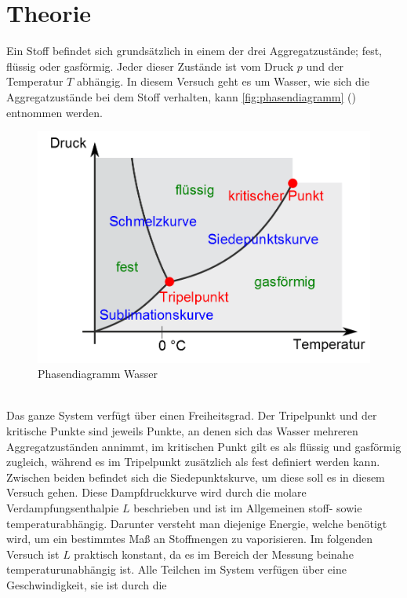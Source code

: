 \section{Theorie}
\label{sec:Theorie}

Ein Stoff befindet sich grundsätzlich in einem der drei Aggregatzustände;
fest, flüssig oder gasförmig. Jeder dieser Zustände ist vom Druck $p$ und
der Temperatur $T$ abhängig. In diesem Versuch geht es um Wasser, wie sich 
die Aggregatzustände bei dem Stoff verhalten, kann \autoref{fig:phasendiagramm}
(\cite{phasendiagramm}) entnommen werden. 
\begin{figure}[h]
    \centering
        \centering
        \includegraphics[width=\textwidth]{Bilder/aggregatzustand.png}
        \caption{Phasendiagramm Wasser}
    \hfill
    \label{fig:phasendiagramm}
\end{figure}
\\
Das ganze System verfügt über einen Freiheitsgrad.
Der Tripelpunkt und der kritische Punkte sind jeweils Punkte, an denen sich das 
Wasser mehreren Aggregatzuständen annimmt, im kritischen Punkt gilt es als
flüssig und gasförmig zugleich, während es im Tripelpunkt zusätzlich als fest 
definiert werden kann. Zwischen beiden befindet sich die Siedepunktskurve, um 
diese soll es in diesem Versuch gehen. Diese Dampfdruckkurve wird durch die 
molare Verdampfungsenthalpie $L$ beschrieben und ist im Allgemeinen stoff-
sowie temperaturabhängig. Darunter versteht man diejenige Energie, welche
benötigt wird, um ein bestimmtes Maß an Stoffmengen zu vaporisieren.
Im folgenden Versuch ist $L$ praktisch konstant, da es im Bereich der Messung
beinahe temperaturunabhängig ist.
Alle Teilchen im System verfügen über eine Geschwindigkeit, sie ist durch die 
